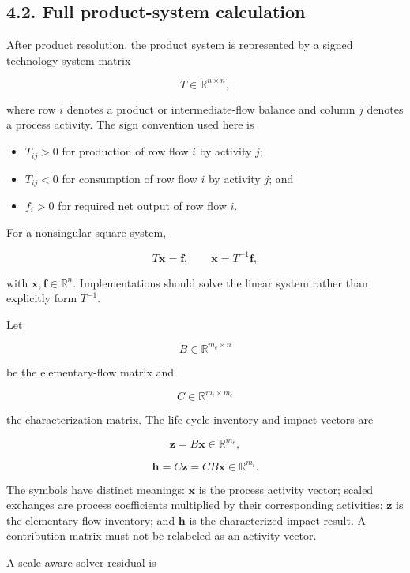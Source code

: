 \documentclass[
  10pt,
  a4paper,
  DIV=11,
  numbers=noendperiod]{scrartcl}
\providecommand{\tightlist}{%
  \setlength{\itemsep}{0pt}\setlength{\parskip}{0pt}}
\begin{document}
\subsection{4.2. Full product-system
calculation}\label{full-product-system-calculation}

After product resolution, the product system is represented by a signed
technology-system matrix

\[
T\in\mathbb{R}^{n\times n},
\]

where row \(i\) denotes a product or intermediate-flow balance and
column \(j\) denotes a process activity. The sign convention used here
is

\begin{itemize}
\tightlist
\item
  \(T_{ij}>0\) for production of row flow \(i\) by activity \(j\);
\item
  \(T_{ij}<0\) for consumption of row flow \(i\) by activity \(j\); and
\item
  \(f_i>0\) for required net output of row flow \(i\).
\end{itemize}

For a nonsingular square system,

\[
T\mathbf{x}=\mathbf{f},
\qquad
\mathbf{x}=T^{-1}\mathbf{f},
\tag{4}
\]

with \(\mathbf{x},\mathbf{f}\in\mathbb{R}^{n}\). Implementations should
solve the linear system rather than explicitly form \(T^{-1}\).

Let

\[
B\in\mathbb{R}^{m_e\times n}
\]

be the elementary-flow matrix and

\[
C\in\mathbb{R}^{m_i\times m_e}
\]

the characterization matrix. The life cycle inventory and impact vectors
are

\[
\mathbf{z}=B\mathbf{x}\in\mathbb{R}^{m_e},
\tag{5}
\]

\[
\mathbf{h}=C\mathbf{z}=CB\mathbf{x}\in\mathbb{R}^{m_i}.
\tag{6}
\]

The symbols have distinct meanings: \(\mathbf{x}\) is the process
activity vector; scaled exchanges are process coefficients multiplied by
their corresponding activities; \(\mathbf{z}\) is the elementary-flow
inventory; and \(\mathbf{h}\) is the characterized impact result. A
contribution matrix must not be relabeled as an activity vector.

A scale-aware solver residual is
\end{document}
